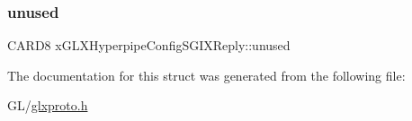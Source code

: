 \subsubsection{\texorpdfstring{unused}{unused}}
{\footnotesize\ttfamily C\+A\+R\+D8 x\+G\+L\+X\+Hyperpipe\+Config\+S\+G\+I\+X\+Reply\+::unused}



The documentation for this struct was generated from the following file\+:\begin{DoxyCompactItemize}
\item 
G\+L/\hyperlink{glxproto_8h}{glxproto.\+h}\end{DoxyCompactItemize}
